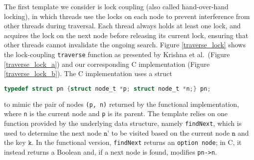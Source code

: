 \documentclass[a4paper,UKenglish,cleveref, autoref, thm-restate]{lipics-v2021}
\begin{document}
The first template we consider is lock coupling (also called hand-over-hand locking), in which threads use the locks on each node to prevent interference from other threads during traversal. Each thread always holds at least one lock, and acquires the lock on the next node before releasing its current lock, ensuring that other threads cannot invalidate the ongoing search.
Figure \ref{traverse_lock} shows the lock-coupling \lstinline{traverse} function as presented by Krishna et al.~(Figure \ref{traverse_lock_a}) and our corresponding C implementation (Figure \ref{traverse_lock_b}). The C implementation uses a struct
\begin{lstlisting}[language = C, backgroundcolor=\color{white}, basicstyle=\ttfamily\footnotesize]
	typedef struct pn {struct node_t *p; struct node_t *n;} pn;
\end{lstlisting}
to mimic the pair of nodes \lstinline{(p, n)} returned by the functional implementation, where \lstinline{n} is the current node and \lstinline{p} is its parent. The template relies on one function provided by the underlying data structure, namely \lstinline{findNext}, which is used to determine the next node $\texttt{n'}$ to be visited based on the current node $\texttt{n}$ and the key $\texttt{k}$. In the functional version, \lstinline{findNext} returns an \lstinline{option node}; in C, it instead returns a Boolean and, if a next node is found, modifies \lstinline{pn->n}.

\end{document}
